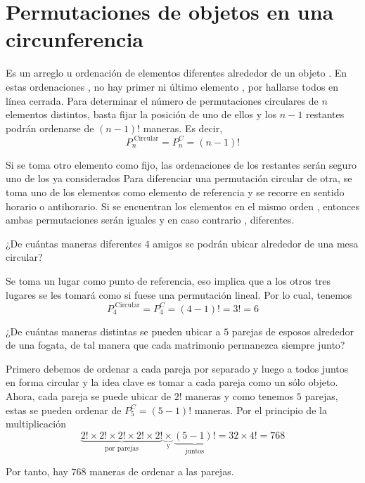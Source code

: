 \documentclass[12pt]{article}
\begin{document}
\section{Permutaciones de objetos en una circunferencia}

\begin{definicion} Es un arreglo u ordenación de elementos diferentes alrededor de un objeto . 
En estas ordenaciones , no hay primer ni último elemento , por hallarse todos en línea cerrada. Para determinar el número de permutaciones circulares de $n$ elementos distintos, basta fijar la posición de uno de ellos y los $n-1$ restantes podrán ordenarse de $(n-1)!$ maneras. Es decir,
\[P^{\;\text{Circular}}_n=P^C_n=(n-1)!\]
\end{definicion}
\begin{obs}
Si se toma otro elemento como fijo, las ordenaciones de los restantes serán seguro uno de los ya considerados  Para diferenciar una permutación circular de otra, se toma uno de los elementos como elemento de referencia y se recorre en sentido horario o antihorario. Si se encuentran los elementos en el mismo orden , entonces ambas permutaciones serán iguales y en caso contrario , diferentes.
\end{obs}

\begin{ejemplo}
¿De cuántas maneras diferentes $4$ amigos se podrán ubicar alrededor de una mesa circular? 
\end{ejemplo}
\begin{solucion}
Se toma un lugar como punto de referencia, eso implica que a los otros tres lugares se les tomará como si fuese una permutación lineal. Por lo cual, tenemos
\[P^{\;\text{Circular}}_4=P^C_4=(4-1)!=3!=6\]
\end{solucion}

\begin{ejemplo}
    ¿De cuántas maneras distintas se pueden ubicar a $5$ parejas de esposos alrededor de una fogata, de tal manera que cada matrimonio permanezca siempre junto?
\end{ejemplo}

\begin{solucion}
Primero debemos de ordenar a cada pareja por separado y luego a todos juntos en forma circular y la idea clave es tomar a cada pareja como un sólo objeto. Ahora, cada pareja se puede ubicar de $2!$ maneras y como tenemos $5$ parejas, estas se pueden ordenar de $P^C_5=(5-1)!$ maneras. Por el principio de la multiplicación
\[\underbrace{2!\times 2!\times 2!\times 2!\times 2!}_{\text{por parejas}}\underbrace{\times}_{\text{y}}\underbrace{(5-1)!}_{\text{juntos}}=32\times 4!=768\]
\end{solucion}
Por tanto, hay $768$ maneras de ordenar a las parejas.
\end{document}
